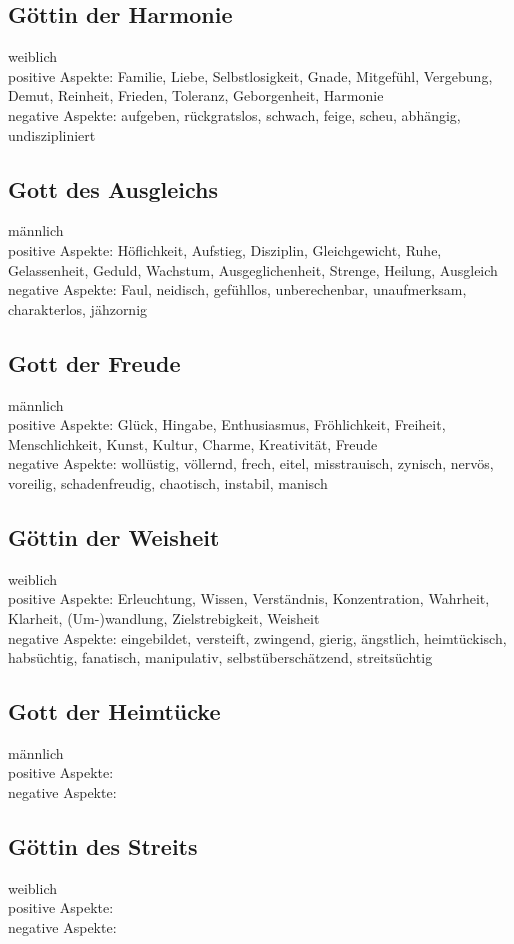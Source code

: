 \subsection{Göttin der Harmonie}
weiblich\\
positive Aspekte: Familie, Liebe, Selbstlosigkeit, Gnade, Mitgefühl, Vergebung, Demut, Reinheit, Frieden, Toleranz, Geborgenheit, Harmonie\\
negative Aspekte: aufgeben, rückgratslos, schwach, feige, scheu, abhängig, undiszipliniert
\subsection{Gott des Ausgleichs}
männlich\\
positive Aspekte: Höflichkeit, Aufstieg, Disziplin, Gleichgewicht, Ruhe, Gelassenheit, Geduld, Wachstum, Ausgeglichenheit, Strenge, Heilung, Ausgleich\\
negative Aspekte: Faul, neidisch, gefühllos, unberechenbar, unaufmerksam, charakterlos, jähzornig
\subsection{Gott der Freude}
männlich\\
positive Aspekte: Glück, Hingabe, Enthusiasmus, Fröhlichkeit, Freiheit, Menschlichkeit, Kunst, Kultur, Charme, Kreativität, Freude\\
negative Aspekte: wollüstig, völlernd, frech, eitel, misstrauisch, zynisch, nervös, voreilig, schadenfreudig, chaotisch, instabil, manisch
\subsection{Göttin der Weisheit}
weiblich\\
positive Aspekte: Erleuchtung, Wissen, Verständnis, Konzentration, Wahrheit, Klarheit, (Um-)wandlung, Zielstrebigkeit, Weisheit\\
negative Aspekte: eingebildet, versteift, zwingend, gierig, ängstlich, heimtückisch, habsüchtig, fanatisch, manipulativ, selbstüberschätzend, streitsüchtig
\subsection{Gott der Heimtücke}
männlich\\
positive Aspekte: \\
negative Aspekte: 
\subsection{Göttin des Streits}
weiblich\\
positive Aspekte: \\
negative Aspekte: 

